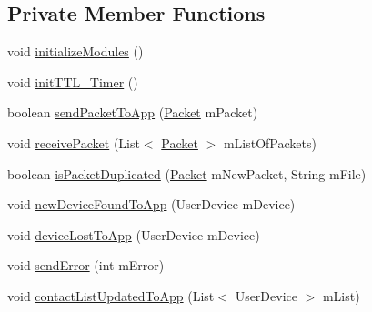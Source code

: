 \subsection*{Private Member Functions}
\begin{DoxyCompactItemize}
\item 
void \hyperlink{classcom_1_1copelabs_1_1oiframework_1_1contentmanager_1_1_content_manager_aa48dc62ec9f9588a1eccfc532519a9b1}{initialize\+Modules} ()
\item 
void \hyperlink{classcom_1_1copelabs_1_1oiframework_1_1contentmanager_1_1_content_manager_aff3f09048a8e2950db68b814784135be}{init\+T\+T\+L\+\_\+\+Timer} ()
\item 
boolean \hyperlink{classcom_1_1copelabs_1_1oiframework_1_1contentmanager_1_1_content_manager_a843d5651fb973b0ba921010858592cf9}{send\+Packet\+To\+App} (\hyperlink{classcom_1_1copelabs_1_1oiframework_1_1contentmanager_1_1_packet}{Packet} m\+Packet)
\item 
void \hyperlink{classcom_1_1copelabs_1_1oiframework_1_1contentmanager_1_1_content_manager_a6efcf27814c50d4fdca421d929c8ac7d}{receive\+Packet} (List$<$ \hyperlink{classcom_1_1copelabs_1_1oiframework_1_1contentmanager_1_1_packet}{Packet} $>$ m\+List\+Of\+Packets)
\item 
boolean \hyperlink{classcom_1_1copelabs_1_1oiframework_1_1contentmanager_1_1_content_manager_a398ef49c6126668a488e7f41cb26a732}{is\+Packet\+Duplicated} (\hyperlink{classcom_1_1copelabs_1_1oiframework_1_1contentmanager_1_1_packet}{Packet} m\+New\+Packet, String m\+File)
\item 
void \hyperlink{classcom_1_1copelabs_1_1oiframework_1_1contentmanager_1_1_content_manager_a44e01742b6c02503c2b9949cf68ae372}{new\+Device\+Found\+To\+App} (User\+Device m\+Device)
\item 
void \hyperlink{classcom_1_1copelabs_1_1oiframework_1_1contentmanager_1_1_content_manager_a9223b3fb51dfb77db68652dbdd6d1c97}{device\+Lost\+To\+App} (User\+Device m\+Device)
\item 
void \hyperlink{classcom_1_1copelabs_1_1oiframework_1_1contentmanager_1_1_content_manager_a39ef377cc2c6398ec52253bb5b362aec}{send\+Error} (int m\+Error)
\item 
void \hyperlink{classcom_1_1copelabs_1_1oiframework_1_1contentmanager_1_1_content_manager_aeffc5e72d64f214dbe1b744b2f2565b9}{contact\+List\+Updated\+To\+App} (List$<$ User\+Device $>$ m\+List)
\end{DoxyCompactItemize}
